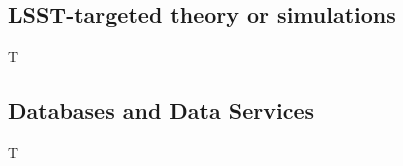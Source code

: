 \subsection{LSST-targeted theory or simulations} \label{sec:tasks:gal:simulations}

\begin{tasklist}{T}
\begin{task}
\label{task:gal:image_simulations}
\motivation{}
\activities{}
\deliverables{}
\end{task}

\begin{task}
\label{task:gal:rare_objects}
\motivation{}
\activities{}
\deliverables{}
\end{task}

\begin{task}
\label{task:gal:cv_estimators}
\motivation{}
\activities{}
\deliverables{}
\end{task}

\begin{task}
\label{task:gal:dwarf_sb_fluctuations}
\motivation{}
\activities{}
\deliverables{}
\end{task}

\begin{task}
\label{task:gal:group_finders}
\motivation{}
\activities{}
\deliverables{}
\end{task}

\end{tasklist}

\subsection{Databases and Data Services} \label{sec:tasks:gal:databases}

\begin{tasklist}{T}
\begin{task}
\label{task:gal:data_structures}
\motivation{}
\activities{}
\deliverables{}
\end{task}

\begin{task}
\label{task:gal:queries}
\motivation{}
\activities{}
\deliverables{}
\end{task}

\begin{task}
\label{task:gal:likelihoods}
\motivation{}
\activities{}
\end{task}

\end{tasklist}
